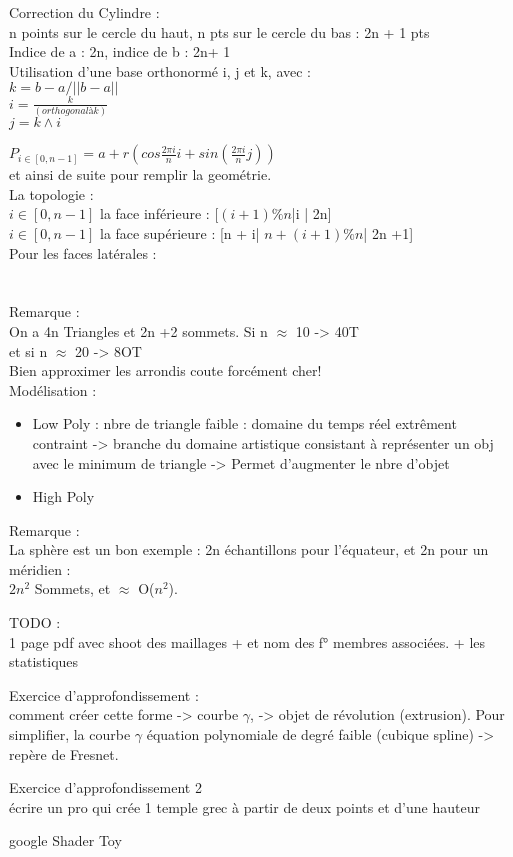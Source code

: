 
Correction du Cylindre : \\
n points sur le cercle du haut, n pts sur le cercle du bas : 2n + 1 pts\\
Indice de a : 2n, indice de b : 2n+ 1\\

Utilisation d'une base orthonormé i, j et k, avec :\\
$k = b-a/||b - a||$\\
$i = \frac{k}{(orthogonal à k)}$\\
$j = k ∧ i$

$P_{i \in [0, n-1]} = a + r(cos\frac{2\pi i}{n} i + sin(\frac{2\pi i}{n}j))$\\
et ainsi de suite pour remplir la geométrie.\\

La topologie :\\
$i \in[0, n-1]$ la face inférieure : [$(i+1)\%n$|i | 2n]\\
$i \in[0, n-1]$ la face supérieure : [n + i| $n +(i+1)\%n$| 2n +1]\\

Pour les faces latérales :\\
[i| $(i+1)\%n$| $n + (i+1)\%n$]\\
[i| $n+ (i+1)\%n$ | $n + i$]\\


Remarque :\\
On a 4n Triangles et 2n +2 sommets. Si n $\approx$ 10 -> 40T\\
et si n $\approx$ 20 -> 8OT\\
Bien approximer les arrondis coute forcément cher!\\

Modélisation :
\begin{itemize}
	\item Low Poly : nbre de triangle faible : domaine du temps réel extrêment contraint -> branche du domaine artistique consistant à représenter un obj avec le minimum de triangle -> Permet d'augmenter le nbre d'objet
	\item High Poly
\end{itemize}

Remarque : \\
La sphère est un bon exemple : 2n échantillons pour l'équateur, et 2n pour un méridien :\\
$2n^2$ Sommets, et $\approx $ O($n^2$).

TODO : \\
1 page pdf avec shoot des maillages + et nom des f° membres associées. + les statistiques

Exercice d'approfondissement : \\
comment créer cette forme -> courbe $\gamma$, -> objet de révolution (extrusion). Pour simplifier, la courbe $\gamma$ équation polynomiale de degré faible (cubique spline) -> repère de Fresnet.

Exercice d'approfondissement 2\\
écrire un pro qui crée 1 temple grec à partir de deux points et d'une hauteur

google Shader Toy

